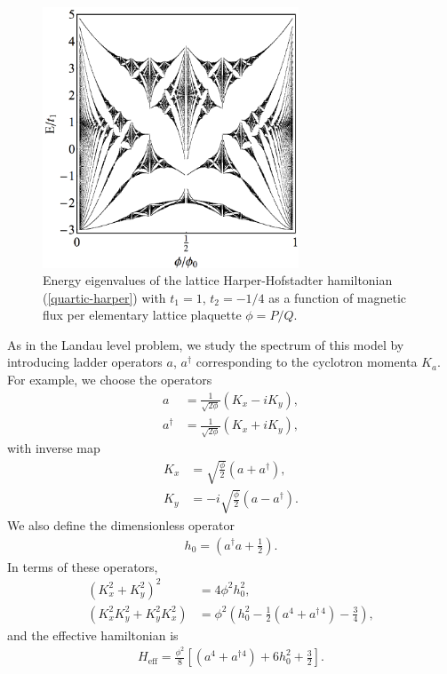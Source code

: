 \documentclass[aps,prb,twocolumn,letterpaper,twoside,nobalancelastpage,groupedaddress,amsmath,amssymb,floatfix,citeautoscript]{revtex4-1}
\begin{document}
\begin{figure}[thb]
\centering
\hspace{-0.25in}\includegraphics[width=3.0in]{q-butterfly-raster-1200.pdf}
\caption{\label{butterfly-plot} Energy eigenvalues of the lattice Harper-Hofstadter hamiltonian (\ref{quartic-harper}) with $t_1 = 1$, $t_2 = -1/4$ as a function of magnetic flux per elementary lattice plaquette $\phi = P/Q$.}
\end{figure}

As in the Landau level problem, we study the spectrum of this model by introducing ladder operators $a$, $a^{\dag}$ corresponding to the cyclotron momenta $K_a$. For example, we choose the operators
\begin{align}
a &= \frac{1}{\sqrt{2\phi}}\left(K_x - iK_y\right),\\
a^{\dag} &= \frac{1}{\sqrt{2\phi}}\left(K_x + iK_y\right),
\end{align}
with inverse map
\begin{align}
K_x &= \sqrt{\frac{\phi}{2}}\left(a + a^{\dag}\right),\\
K_y &= -i\sqrt{\frac{\phi}{2}}\left(a - a^{\dag}\right).
\end{align}
We also define the dimensionless operator
\begin{align}
h_0 = \left(a^{\dag}a + \frac{1}{2}\right).
\end{align}
In terms of these operators,
\begin{align}
\left(K_x^2 + K_y^2\right)^2 &= 4\phi^2 h_0^2, \\
\left(K_x^2K_y^2 + K_y^2K_x^2\right) &= \phi^2\left(h_0^2 -\frac{1}{2}\left(a^4 + a^{\dag\,4}\right) - \frac{3}{4}\right),
\end{align}
and the effective hamiltonian is
\begin{align}
\label{effective-fock-hamiltonian}
H_{\text{eff}} = \frac{\phi^2}{8}\left[\left(a^4 + a^{\dag 4}\right) + 6h_0^2 + \frac{3}{2}\right].
\end{align}
\end{document}
